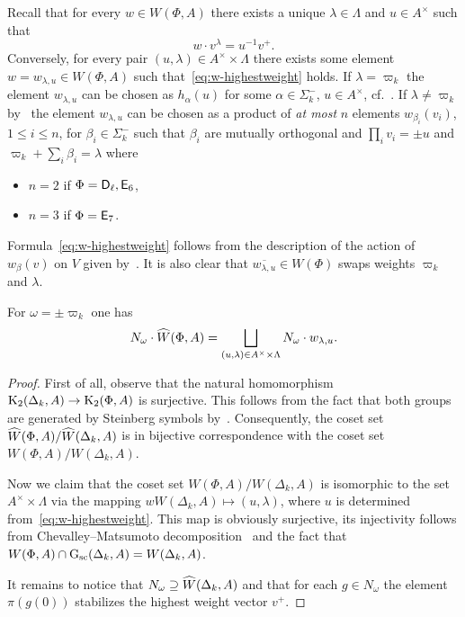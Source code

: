 Recall that for every $w \in W(\Phi, A)$ there exists a unique $\lambda \in \Lambda$ and $u \in A^\times $ such that
 \begin{equation}\label{eq:w-highestweight} w \cdot v^\lambda = u^{-1} v^+. \end{equation}
Conversely, for every pair $(u, \lambda) \in A^\times \times \Lambda$ there exists some element $w = w_{\lambda, u} \in W(\Phi, A)$ such that~\eqref{eq:w-highestweight} holds.
    If $\lambda = \varpi_k$ the element $w_{\lambda, u}$ can be chosen as $h_\alpha(u)$ for some $\alpha \in \Sigma_k^-$, $u \in A^\times$, cf.~\cite[Lemma~7]{V00}.
    If $\lambda \neq \varpi_k$ by~\cite[Lemma~6]{V00} the element $w_{\lambda, u}$ can be chosen as a product of \textit{at most} $n$ elements
     $w_{\beta_i}(v_i)$, $1 \leq i \leq n$, for $\beta_i\in\Sigma_k^-$ such that $\beta_i$ are mutually orthogonal and $\prod_i v_i = \pm u$ and $\varpi_k + \sum_i \beta_i = \lambda$ where
    \begin{itemize}
        \item $n=2$ if $\Phi = \mathsf{D}_\ell, \mathsf{E}_6$,
        \item $n=3$ if $\Phi = \mathsf{E}_7$.
    \end{itemize}
    Formula~\eqref{eq:w-highestweight} follows from the description of the action of $w_\beta(v)$ on $V$ given by~\cite[Lemma~6]{V00}.
    It is also clear that $\overline{w_{\lambda, u}} \in W(\Phi)$ swaps weights $\varpi_k$ and $\lambda$.

\begin{lemma} \label{lem:can-repr}
  For $\omega = \pm \varpi_k$ one has \[N_{\omega} \cdot \widehat{W}(\Phi, A) = \bigsqcup\limits_{(u, \lambda) \in A^\times \times \Lambda} N_{\omega} \cdot w_{\lambda, u}. \]
\end{lemma}
\begin{proof}
  First of all, observe that the natural homomorphism $\operatorname{K}_2(\Delta_k, A) \to \operatorname{K}_2(\Phi, A)$ is surjective.
  This follows from the fact that both groups are generated by Steinberg symbols by~\cite[Theorem~2.5]{Ste73}.
  Consequently, the coset set $\widehat{W}(\Phi, A) / \widehat{W}(\Delta_k, A)$ is in bijective correspondence with the coset set $W(\Phi, A)/W(\Delta_k, A)$.

  Now we claim that the coset set $W(\Phi, A)/W(\Delta_k, A)$ is isomorphic to the set $A^\times \times \Lambda$
   via the mapping $w W(\Delta_k, A) \mapsto (u, \lambda)$, where $u$ is determined from~\eqref{eq:w-highestweight}.
  This map is obviously surjective, its injectivity follows from Chevalley--Matsumoto decomposition~\cite[Theorem~1.3]{St78}
   and the fact that $W(\Phi, A) \cap \operatorname{G}_\mathrm{sc}(\Delta_k, A) = W(\Delta_k, A)$.

  It remains to notice that $N_{\omega} \supseteq \widehat{W}(\Delta_k, A)$ and that for each $g \in N_{\omega}$ the element $\pi(g(0))$ stabilizes the highest weight vector $v^+$.
\end{proof}

